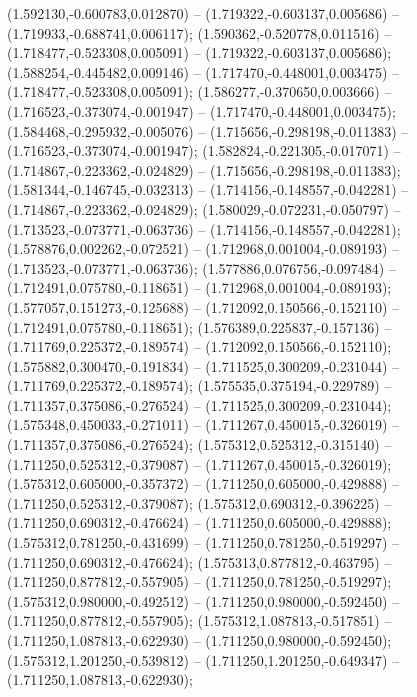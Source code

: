  (1.592130,-0.600783,0.012870) -- (1.719322,-0.603137,0.005686) -- (1.719933,-0.688741,0.006117);
 (1.590362,-0.520778,0.011516) -- (1.718477,-0.523308,0.005091) -- (1.719322,-0.603137,0.005686);
 (1.588254,-0.445482,0.009146) -- (1.717470,-0.448001,0.003475) -- (1.718477,-0.523308,0.005091);
 (1.586277,-0.370650,0.003666) -- (1.716523,-0.373074,-0.001947) -- (1.717470,-0.448001,0.003475);
 (1.584468,-0.295932,-0.005076) -- (1.715656,-0.298198,-0.011383) -- (1.716523,-0.373074,-0.001947);
 (1.582824,-0.221305,-0.017071) -- (1.714867,-0.223362,-0.024829) -- (1.715656,-0.298198,-0.011383);
 (1.581344,-0.146745,-0.032313) -- (1.714156,-0.148557,-0.042281) -- (1.714867,-0.223362,-0.024829);
 (1.580029,-0.072231,-0.050797) -- (1.713523,-0.073771,-0.063736) -- (1.714156,-0.148557,-0.042281);
 (1.578876,0.002262,-0.072521) -- (1.712968,0.001004,-0.089193) -- (1.713523,-0.073771,-0.063736);
 (1.577886,0.076756,-0.097484) -- (1.712491,0.075780,-0.118651) -- (1.712968,0.001004,-0.089193);
 (1.577057,0.151273,-0.125688) -- (1.712092,0.150566,-0.152110) -- (1.712491,0.075780,-0.118651);
 (1.576389,0.225837,-0.157136) -- (1.711769,0.225372,-0.189574) -- (1.712092,0.150566,-0.152110);
 (1.575882,0.300470,-0.191834) -- (1.711525,0.300209,-0.231044) -- (1.711769,0.225372,-0.189574);
 (1.575535,0.375194,-0.229789) -- (1.711357,0.375086,-0.276524) -- (1.711525,0.300209,-0.231044);
 (1.575348,0.450033,-0.271011) -- (1.711267,0.450015,-0.326019) -- (1.711357,0.375086,-0.276524);
 (1.575312,0.525312,-0.315140) -- (1.711250,0.525312,-0.379087) -- (1.711267,0.450015,-0.326019);
 (1.575312,0.605000,-0.357372) -- (1.711250,0.605000,-0.429888) -- (1.711250,0.525312,-0.379087);
 (1.575312,0.690312,-0.396225) -- (1.711250,0.690312,-0.476624) -- (1.711250,0.605000,-0.429888);
 (1.575312,0.781250,-0.431699) -- (1.711250,0.781250,-0.519297) -- (1.711250,0.690312,-0.476624);
 (1.575313,0.877812,-0.463795) -- (1.711250,0.877812,-0.557905) -- (1.711250,0.781250,-0.519297);
 (1.575312,0.980000,-0.492512) -- (1.711250,0.980000,-0.592450) -- (1.711250,0.877812,-0.557905);
 (1.575312,1.087813,-0.517851) -- (1.711250,1.087813,-0.622930) -- (1.711250,0.980000,-0.592450);
 (1.575312,1.201250,-0.539812) -- (1.711250,1.201250,-0.649347) -- (1.711250,1.087813,-0.622930);
